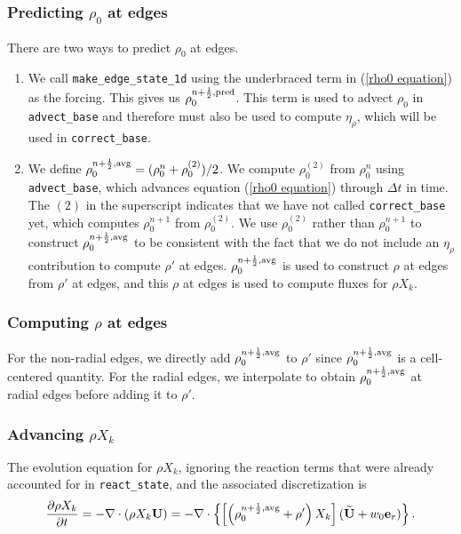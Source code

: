 \documentclass[11pt]{article}
\def\half  {\frac{1}{2}}
\def\eb    {{\bf e}}
\def\Ub    {{\bf U}}
\def\Ubt   {\widetilde{\bf U}}
\begin{document}
\subsubsection{Predicting $\rho_0$ at edges}\label{Predicting rho0 at edges}
There are two ways to predict $\rho_0$ at edges.
\begin{enumerate}
\item We call {\tt make\_edge\_state\_1d} using the underbraced term in 
(\ref{rho0 equation}) as the forcing.  This gives us $\rho_0^{n+\half,{\rm pred}}$.
This term is used to advect $\rho_0$ in {\tt advect\_base} and therefore must also be used 
to compute $\eta_\rho$, which will be used in {\tt correct\_base}.
\item We define $\rho_0^{n+\half,{\rm avg}} = (\rho_0^n + \rho_0^{(2)})/2$.  We 
compute $\rho_0^{(2)}$ from $\rho_0^n$ using {\tt advect\_base}, which advances equation 
(\ref{rho0 equation}) through $\Delta t$ in time.  The $(2)$ in the superscript indicates 
that we have not called {\tt correct\_base} yet, which computes  $\rho_0^{n+1}$ from $\rho_0^{(2)}$. 
We use $\rho_0^{(2)}$ rather than $\rho_0^{n+1}$ to construct $\rho_0^{n+\half,{\rm avg}}$ to be 
consistent with the fact that we do not include an $\eta_\rho$ contribution to compute 
$\rho'$ at edges.  $\rho_0^{n+\half,{\rm avg}}$ is used to construct $\rho$ at edges from 
$\rho'$ at edges, and this $\rho$ at edges is used to compute fluxes for $\rho X_k$.  
\end{enumerate}
\subsubsection{Computing $\rho$ at edges}\label{Computing rho at edges}
For the non-radial edges, we directly add $\rho_0^{n+\half,{\rm avg}}$ to $\rho'$ since 
$\rho_0^{n+\half,{\rm avg}}$ is a cell-centered quantity.  For the radial edges, we 
interpolate to obtain $\rho_0^{n+\half,{\rm avg}}$ at radial edges before adding it to $\rho'$.
\subsubsection{Advancing $\rho X_k$}\label{Advancing rhoX_k}
The evolution equation for $\rho X_k$, ignoring the reaction terms that were already 
accounted for in {\tt react\_state}, and the associated discretization is
\begin{equation}
\frac{\partial\rho X_k}{\partial t} = -\nabla\cdot(\rho X_k\Ub) = 
-\nabla\cdot\left\{\left[\left(\rho_0^{n+\half,{\rm avg}} 
+ \rho'\right)X_k\right](\Ubt+w_0\eb_r)\right\}.
\end{equation}
\end{document}
